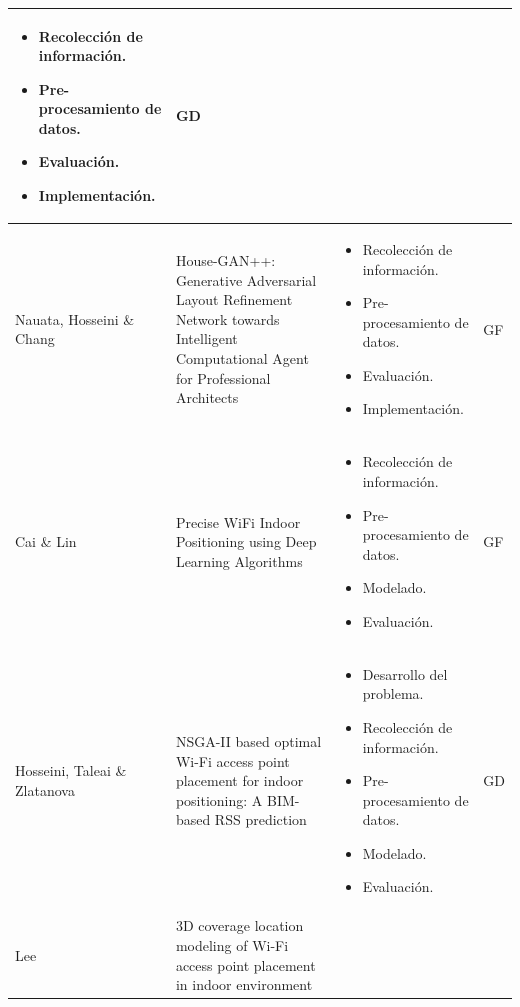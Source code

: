 \begin{longtable}{M{3cm}M{5.5cm}M{5.5cm}M{1.5cm}}
\begin{itemize}[label={--},nosep,noitemsep,leftmargin=*,topsep=0pt,partopsep=0pt]
				\item Recolección de información.
				\item Pre-procesamiento de datos.
				\item Evaluación.
				\item Implementación.
			\end{itemize}
			& GD
			\\
			\hline
			Nauata, Hosseini \& Chang
			& House-GAN++: Generative Adversarial Layout Refinement Network towards Intelligent Computational Agent for Professional Architects
			& 
			\begin{itemize}[label={--},nosep,noitemsep,leftmargin=*,topsep=0pt,partopsep=0pt]
				\item Recolección de información.
				\item Pre-procesamiento de datos.
				\item Evaluación.
				\item Implementación.
			\end{itemize}
			& GF
			\\
			\hline
			Cai \& Lin
			& Precise WiFi Indoor Positioning using Deep Learning Algorithms
			& 
			\begin{itemize}[label={--},nosep,noitemsep,leftmargin=*,topsep=0pt,partopsep=0pt]
				\item Recolección de información.
				\item Pre-procesamiento de datos.
				\item Modelado.
				\item Evaluación.
			\end{itemize}
			&  GF
			\\
			\hline
			Hosseini, Taleai \& Zlatanova
			& NSGA-II based optimal Wi-Fi access point placement for indoor positioning: A BIM-based RSS prediction
			& 
			\begin{itemize}[label={--},nosep,noitemsep,leftmargin=*,topsep=0pt,partopsep=0pt]
				\item Desarrollo del problema.
				\item Recolección de información.
				\item Pre-procesamiento de datos.
				\item Modelado.
				\item Evaluación.
			\end{itemize}
			& GD
			\\
			\hline
			Lee
			& 3D coverage location modeling of Wi-Fi access point placement in indoor environment

\end{longtable}
